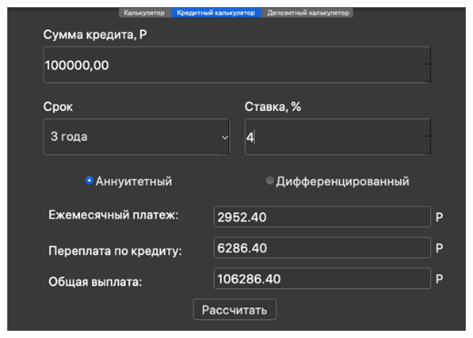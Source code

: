\documentclass[]{article}
\begin{document}
\includegraphics[width=6.00653in,height=4.37444in]{media/image4.png}
\end{document}
